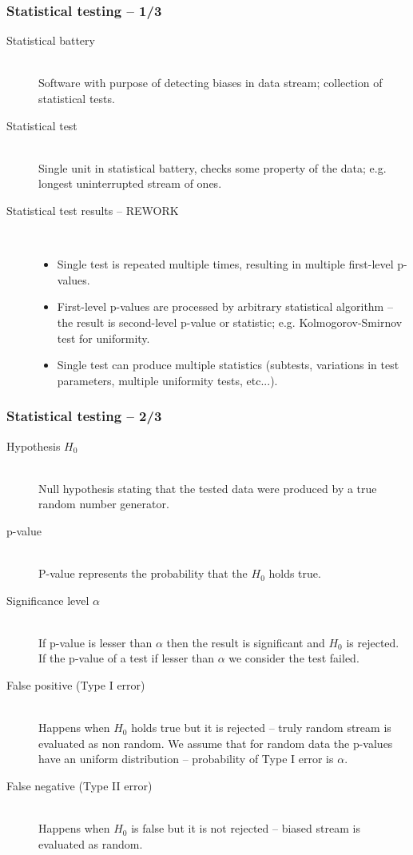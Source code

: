 \documentclass[aspectratio=169]{beamer}
\begin{document}
\begin{frame}
\frametitle{Statistical testing -- 1/3}

\begin{description}
\item[Statistical battery] \hfill \\ 
Software with purpose of detecting biases in data stream; collection of statistical tests.
\item[Statistical test] \hfill \\
Single unit in statistical battery, checks some property of the data; e.g. longest uninterrupted stream of ones.

\vspace{.3cm}

\item[Statistical test results -- REWORK] \hfill \\
\begin{itemize}
\item Single test is repeated multiple times, resulting in multiple first-level p-values.
\item First-level p-values are processed by arbitrary statistical algorithm -- the result is second-level p-value or statistic; e.g. Kolmogorov-Smirnov test for uniformity.
\item Single test can produce multiple statistics (subtests, variations in test parameters, multiple uniformity tests, etc...).
\end{itemize}
\end{description}

\end{frame}

\begin{frame}
\frametitle{Statistical testing -- 2/3}

\begin{description}
\item[Hypothesis $H_0$] \hfill \\
Null hypothesis stating that the tested data were produced by a true random number generator.
\item[p-value] \hfill \\
P-value represents the probability that the $H_0$ holds true.
\item[Significance level $\alpha$] \hfill \\
If p-value is lesser than $\alpha$ then the result is significant and $H_0$ is rejected. If the p-value of a test if lesser than $\alpha$ we consider the test failed.
\item[False positive (Type I error)] \hfill \\
Happens when $H_0$ holds true but it is rejected -- truly random stream is evaluated as non random. We assume that for random data the p-values have an uniform distribution -- probability of Type I error is $\alpha$.
\item[False negative (Type II error)] \hfill \\
Happens when $H_0$ is false but it is not rejected -- biased stream is evaluated as random.
\end{description}

\end{frame}
\end{document}
